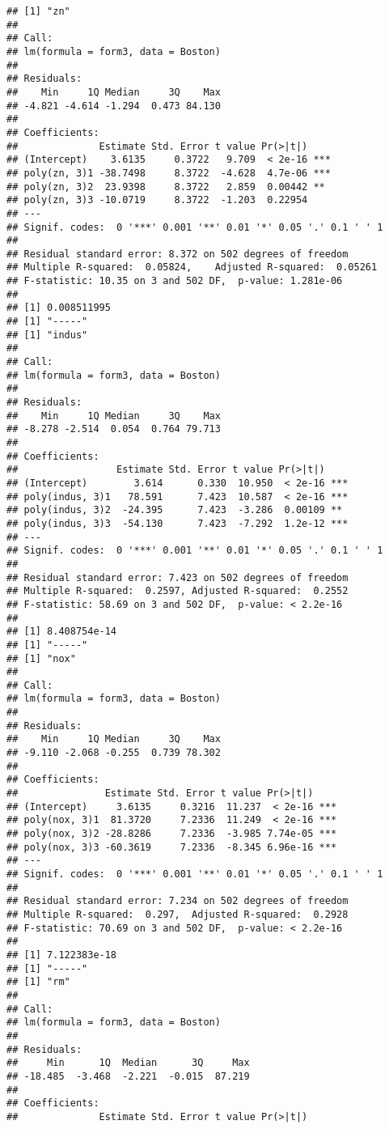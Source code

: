 \documentclass[]{article}
\begin{document}
\begin{verbatim}
## [1] "zn"
## 
## Call:
## lm(formula = form3, data = Boston)
## 
## Residuals:
##    Min     1Q Median     3Q    Max 
## -4.821 -4.614 -1.294  0.473 84.130 
## 
## Coefficients:
##              Estimate Std. Error t value Pr(>|t|)    
## (Intercept)    3.6135     0.3722   9.709  < 2e-16 ***
## poly(zn, 3)1 -38.7498     8.3722  -4.628  4.7e-06 ***
## poly(zn, 3)2  23.9398     8.3722   2.859  0.00442 ** 
## poly(zn, 3)3 -10.0719     8.3722  -1.203  0.22954    
## ---
## Signif. codes:  0 '***' 0.001 '**' 0.01 '*' 0.05 '.' 0.1 ' ' 1
## 
## Residual standard error: 8.372 on 502 degrees of freedom
## Multiple R-squared:  0.05824,    Adjusted R-squared:  0.05261 
## F-statistic: 10.35 on 3 and 502 DF,  p-value: 1.281e-06
## 
## [1] 0.008511995
## [1] "-----"
## [1] "indus"
## 
## Call:
## lm(formula = form3, data = Boston)
## 
## Residuals:
##    Min     1Q Median     3Q    Max 
## -8.278 -2.514  0.054  0.764 79.713 
## 
## Coefficients:
##                 Estimate Std. Error t value Pr(>|t|)    
## (Intercept)        3.614      0.330  10.950  < 2e-16 ***
## poly(indus, 3)1   78.591      7.423  10.587  < 2e-16 ***
## poly(indus, 3)2  -24.395      7.423  -3.286  0.00109 ** 
## poly(indus, 3)3  -54.130      7.423  -7.292  1.2e-12 ***
## ---
## Signif. codes:  0 '***' 0.001 '**' 0.01 '*' 0.05 '.' 0.1 ' ' 1
## 
## Residual standard error: 7.423 on 502 degrees of freedom
## Multiple R-squared:  0.2597, Adjusted R-squared:  0.2552 
## F-statistic: 58.69 on 3 and 502 DF,  p-value: < 2.2e-16
## 
## [1] 8.408754e-14
## [1] "-----"
## [1] "nox"
## 
## Call:
## lm(formula = form3, data = Boston)
## 
## Residuals:
##    Min     1Q Median     3Q    Max 
## -9.110 -2.068 -0.255  0.739 78.302 
## 
## Coefficients:
##               Estimate Std. Error t value Pr(>|t|)    
## (Intercept)     3.6135     0.3216  11.237  < 2e-16 ***
## poly(nox, 3)1  81.3720     7.2336  11.249  < 2e-16 ***
## poly(nox, 3)2 -28.8286     7.2336  -3.985 7.74e-05 ***
## poly(nox, 3)3 -60.3619     7.2336  -8.345 6.96e-16 ***
## ---
## Signif. codes:  0 '***' 0.001 '**' 0.01 '*' 0.05 '.' 0.1 ' ' 1
## 
## Residual standard error: 7.234 on 502 degrees of freedom
## Multiple R-squared:  0.297,  Adjusted R-squared:  0.2928 
## F-statistic: 70.69 on 3 and 502 DF,  p-value: < 2.2e-16
## 
## [1] 7.122383e-18
## [1] "-----"
## [1] "rm"
## 
## Call:
## lm(formula = form3, data = Boston)
## 
## Residuals:
##     Min      1Q  Median      3Q     Max 
## -18.485  -3.468  -2.221  -0.015  87.219 
## 
## Coefficients:
##              Estimate Std. Error t value Pr(>|t|)    

\end{verbatim}
\end{document}
